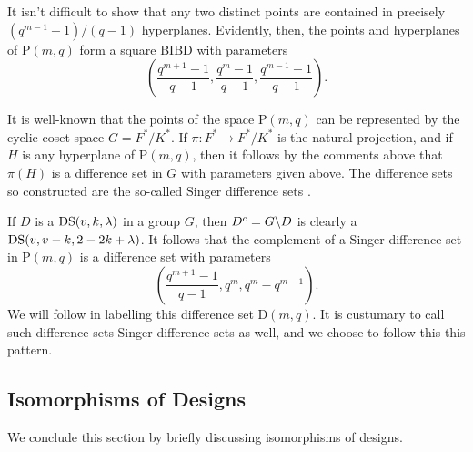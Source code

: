 \documentclass[../../../main]{subfiles}
\begin{document}
It isn't difficult to show that any two distinct points are contained in precisely $(q^{m-1}-1)/(q-1)$ hyperplanes. Evidently, then, the points and hyperplanes of P$(m,q)$ form a square BIBD with parameters
\begin{equation*}%
\left(
\frac{q^{m+1}-1}{q-1}, \frac{q^m-1}{q-1}, \frac{q^{m-1}-1}{q-1}
\right).
\end{equation*}

It is well-known that the points of the space P$(m,q)$ can be represented by the cyclic coset space $G=F^*/K^*$. If $\pi: F^* \rightarrow F^*/K^*$ is the natural projection, and if $H$ is any hyperplane of P$(m,q)$, then it follows by the comments above that $\pi(H)$ is a difference set in $G$ with parameters given above. The difference sets so constructed are the so-called Singer difference sets \citep{singer}.

If $D$ is a $\text{DS}(v,k,\lambda)$ in a group $G$, then $D^c = G \backslash D$ is clearly a $\text{DS}(v,v-k,2-2k+\lambda)$. It follows that the complement of a Singer difference set in P$(m,q)$ is a difference set with parameters
\begin{equation*}%
\left(
\frac{q^{m+1}-1}{q-1}, q^m, q^m - q^{m-1}
\right).
\end{equation*}
We will follow \cite{waterloo} in labelling this difference set D$(m,q)$. It is custumary to call such difference sets Singer difference sets as well, and we choose to follow this this pattern.

\dinkus

\subsection{Isomorphisms of Designs}

We conclude this section by briefly discussing isomorphisms of designs. 
\end{document}
